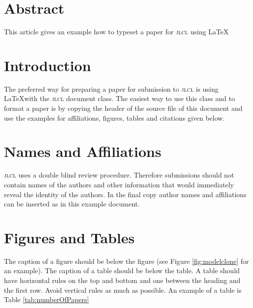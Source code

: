 \documentclass{jlcl}
\begin{document}
\setcounter{page}{1}
\thispagestyle{plain}

\authordata




\section*{Abstract}
This article gives an example how to typeset a paper for \textsc{jlcl} using \LaTeX



\section{Introduction}

The preferred way for preparing a paper for submission to \textsc{jlcl} is using \LaTeX with the \textsc{jlcl} document class. The easiest way to use this class and to format a paper is by copying the header of the source file of this document and use the examples for affiliations, figures, tables and citations given below.

\section{Names and Affiliations}

\textsc{jlcl} uses a double blind review procedure. Therefore submissions should not contain names of the authors and other information that would immediately reveal the identity of the authors.  In the final copy author names and affiliations can be inserted as in this example document.

\section{Figures and Tables}

The caption of a figure should be below the figure (see Figure \ref{fig:modelclone} for an example). The caption of a table should be below the table.  A table should have horizontal rules on the top and bottom and one between the heading and the first row. Avoid vertical rules as much as possible. An example of a table is Table \ref{tab:numberOfPapers}
\end{document}
